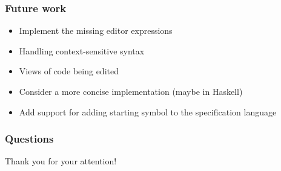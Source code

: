\documentclass[t,24pt,aspectratio=169]{beamer}
\begin{document}
\begin{frame}[hvid]
    \frametitle{Future work}

    \begin{itemize}
        \item Implement the missing editor expressions
        \item Handling context-sensitive syntax
        \item Views of code being edited
        \item Consider a more concise implementation (maybe in Haskell)
        \item Add support for adding starting symbol to the specification language
    \end{itemize}
\end{frame}



\begin{frame}[hvid]
    \frametitle{Questions}
    \centering
    \large{Thank you for your attention!}
\end{frame}
\end{document}
